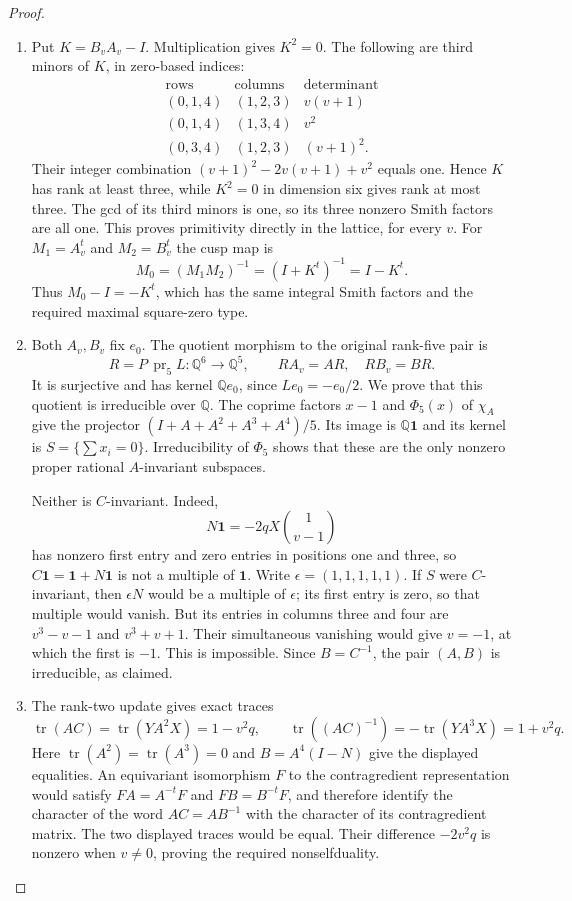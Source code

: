 \documentclass[11pt,a4paper]{article}
\numberwithin{equation}{section}
\theoremstyle{definition}
\begin{document}
\begin{proof}
\begin{enumerate}[label=\arabic*.]
\item Put $K=B_vA_v-I$. Multiplication gives $K^2=0$.
The following are third minors of $K$, in zero-based indices:
\[
 \begin{array}{c|c|c}
 \text{rows}&\text{columns}&\text{determinant}\\\hline
 (0,1,4)&(1,2,3)&v(v+1)\\
 (0,1,4)&(1,3,4)&v^2\\
 (0,3,4)&(1,2,3)&(v+1)^2.
 \end{array}
\]
Their integer combination $(v+1)^2-2v(v+1)+v^2$ equals one.
Hence $K$ has rank at least three, while $K^2=0$ in dimension six
gives rank at most three. The gcd of its third minors is one,
so its three nonzero Smith factors are all one. This proves
primitivity directly in the lattice, for every $v$.
For $M_1=A_v^t$ and $M_2=B_v^t$ the cusp map is
\[
 M_0=(M_1M_2)^{-1}=(I+K^t)^{-1}=I-K^t.
\]
Thus $M_0-I=-K^t$, which has the same integral Smith factors
and the required maximal square-zero type.

\item Both $A_v,B_v$ fix $e_0$. The quotient morphism to
the original rank-five pair is
\[
 R=P\,\operatorname{pr}_5 L:\mathbb Q^6\longrightarrow\mathbb Q^5,
 \qquad RA_v=AR,\quad RB_v=BR.
\]
It is surjective and has kernel $\mathbb Qe_0$, since
$Le_0=-e_0/2$. We prove that this quotient is irreducible over
$\mathbb Q$. The coprime factors $x-1$ and $\Phi_5(x)$ of
$\chi_A$ give the projector
$(I+A+A^2+A^3+A^4)/5$. Its image is $\mathbb Q\mathbf1$ and
its kernel is $S=\{\sum x_i=0\}$. Irreducibility of $\Phi_5$
shows that these are the only nonzero proper rational
$A$-invariant subspaces.

Neither is $C$-invariant. Indeed,
\[
 N\mathbf1=-2qX\binom{1}{v-1}
\]
has nonzero first entry and zero entries in positions one and three,
so $C\mathbf1=\mathbf1+N\mathbf1$ is not a multiple of
$\mathbf1$. Write $\epsilon=(1,1,1,1,1)$. If $S$ were
$C$-invariant, then $\epsilon N$ would be a multiple of
$\epsilon$; its first entry is zero, so that multiple would
vanish. But its entries in columns three and four are
$v^3-v-1$ and $v^3+v+1$. Their simultaneous vanishing would
give $v=-1$, at which the first is $-1$. This is impossible.
Since $B=C^{-1}$, the pair $(A,B)$ is irreducible, as claimed.

\item The rank-two update gives exact traces
\[
 \operatorname{tr}(AC)=\operatorname{tr}(YA^2X)=1-v^2q,
 \qquad
 \operatorname{tr}((AC)^{-1})
       =-\operatorname{tr}(YA^3X)=1+v^2q.
\]
Here $\operatorname{tr}(A^2)=\operatorname{tr}(A^3)=0$ and
$B=A^4(I-N)$ give the displayed equalities. An equivariant
isomorphism $F$ to the contragredient representation would
satisfy $FA=A^{-t}F$ and $FB=B^{-t}F$, and therefore identify
the character of the word $AC=AB^{-1}$ with the character
of its contragredient matrix. The two displayed traces would
be equal. Their difference $-2v^2q$ is nonzero when $v\ne0$,
proving the required nonselfduality.


\end{enumerate}
\end{proof}
\end{document}
